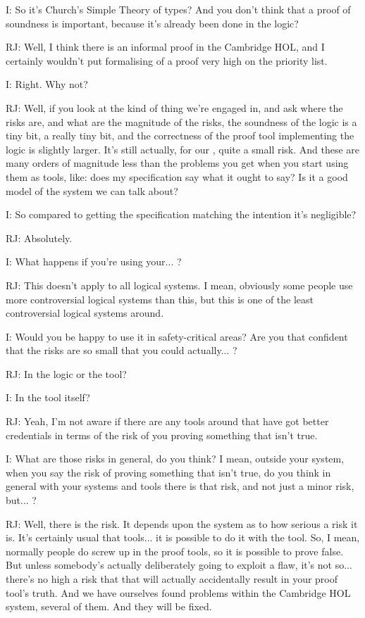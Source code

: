 \documentclass[10pt,titlepage]{book}
\begin{document}
I: So it's Church's Simple Theory of types? And you don't think that a proof of soundness is important, because it's already been done in the logic?

RJ: Well, I think there is an informal proof in the Cambridge HOL, and I certainly wouldn't put formalising of a proof very high on the priority list.

I: Right. Why not?

RJ: Well, if you look at the kind of thing we're engaged in, and ask where the risks are, and what are the magnitude of the risks, the soundness of the logic is a tiny bit, a really tiny bit, and the correctness of the proof tool implementing the logic is slightly larger. It's still actually, for our	, quite a small risk. And these are many orders of magnitude less than the problems you get when you start using them as tools, like: does my specification say what it ought to say? Is it a good model of the system we can talk about?

I: So compared to getting the specification matching the intention it's negligible?

RJ: Absolutely.

I: What happens if you're using your... ?

RJ: This doesn't apply to all logical systems. I mean, obviously some people use more controversial logical systems than this, but this is one of the least controversial logical systems around.

I: Would you be happy to use it in safety-critical areas? Are you that confident that the risks are so small that you could actually... ?

RJ: In the logic or the tool?

I: In the tool itself?

RJ: Yeah, I'm not aware if there are any tools around that have got better credentials in terms of the risk of you proving something that isn't true.

I: What are those risks in general, do you think? I mean, outside your system, when you say the risk of proving something that isn't true, do you think in general with your systems and tools there is that risk, and not just a minor risk, but... ?

RJ: Well, there is the risk. It depends upon the system as to how serious a risk it is. It's certainly usual that tools... it is possible to do it with the tool. So, I mean, normally people do screw up in the proof tools, so it is possible to prove false. But unless somebody's actually deliberately going to exploit a flaw, it's not so... there's no high a risk that that will actually accidentally result in your proof tool's truth. And we have ourselves found problems within the Cambridge HOL system, several of them. And they will be fixed.
\end{document}
